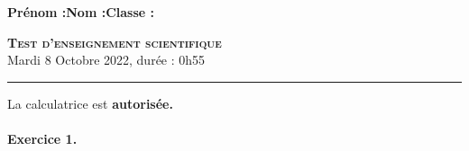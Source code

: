 \documentclass[11pt]{article}
\begin{document}

\noindent\textbf{Prénom :}\hfill\textbf{Nom :}\hfill\textbf{Classe :}\\[1cm]
\begin{center}
\textbf{\LARGE \textsc{Test d'enseignement scientifique}}\\[2mm]

{\large Mardi 8 Octobre 2022, durée : 0h55}\\[1mm]
\noindent\rule{12cm}{0.4pt}
\end{center}
La calculatrice est \textbf{autorisée.}

\paragraph{Exercice 1.}
\end{document}
